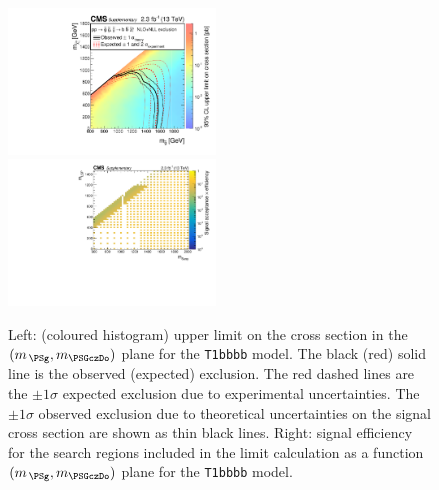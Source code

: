 \clearpage
\begin{figure}[!h]
  \begin{center}
    \includegraphics[width=0.49\textwidth]{RA1T1bbbbXSEC_aux} \, 
    \includegraphics[width=0.49\textwidth]{T1bbbb_merging_4_cats_aux} \,     
  \end{center}
  \caption{Left: (coloured histogram) upper limit on the cross section in the $(m_{\,\PSg}, m_{\PSGczDo})$ plane for the \texttt{T1bbbb} model. 
  The black (red) solid line is the observed (expected) exclusion. The red dashed lines are the $\pm1\sigma$ expected exclusion due to experimental uncertainties. 
  The $\pm1\sigma$ observed exclusion due to theoretical uncertainties on the signal cross section are shown as thin black lines. 
  Right: signal efficiency for the search regions included in the limit calculation as a function $(m_{\,\PSg}, m_{\PSGczDo})$ plane for the \texttt{T1bbbb} model. 
  \label{fig:T1bbbb_excl}}
\end{figure}


